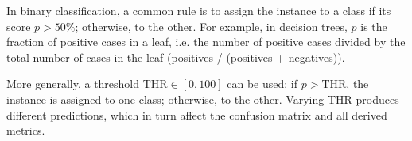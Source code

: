 In binary classification, a common rule is to assign the instance to a class if its score $p > 50\%$; otherwise, to the other. For example, in decision trees, $p$ is the fraction of positive cases in a leaf, i.e. the number of positive cases divided by the total number of cases in the leaf (positives / (positives + negatives)).

More generally, a threshold $\text{THR} \in [0,100]$ can be used: if $p > \text{THR}$, the instance is assigned to one class; otherwise, to the other. Varying $\text{THR}$ produces different predictions, which in turn affect the confusion matrix and all derived metrics.